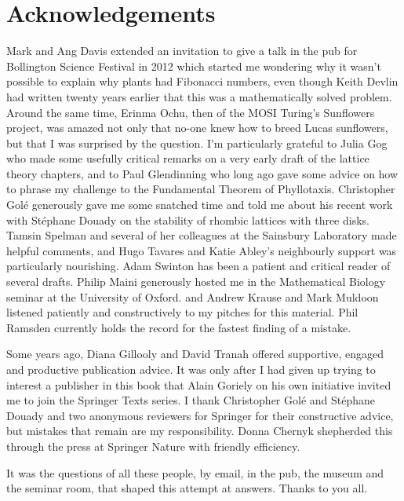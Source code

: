 


\chapter*{Acknowledgements}
Mark and Ang Davis extended an invitation to give a talk in the pub for Bollington Science Festival in 2012 which started me wondering why it wasn't possible to explain why plants had Fibonacci numbers, even though Keith Devlin had written twenty years earlier that this was a mathematically solved problem. Around the same time, Erinma Ochu, then of the MOSI Turing's Sunflowers project, was amazed not only that no-one knew how to breed Lucas sunflowers, but that I was surprised by the question.  
I'm particularly grateful to Julia Gog who made some usefully critical remarks on a very early draft of the lattice theory chapters, and to Paul Glendinning who long ago gave some advice on how to phrase my challenge to the Fundamental Theorem of Phyllotaxis.
Christopher Golé generously gave me some snatched time and told me about his recent work with Stéphane Douady on the stability of rhombic lattices with three disks. Tamsin Spelman and several of her colleagues at the Sainsbury Laboratory made helpful comments, and Hugo Tavares and Katie Abley's neighbourly support was particularly nourishing. Adam Swinton has been a patient and critical reader of several drafts.   Philip Maini generously hosted me in the Mathematical Biology seminar at the University of Oxford. and Andrew Krause and Mark Muldoon listened patiently and constructively to my pitches for this material. Phil Ramsden currently holds the record for the fastest finding of a mistake. 

Some years ago,  Diana Gillooly and David Tranah offered supportive, engaged and productive publication advice. It was only after I had given up trying to interest a publisher in this book that Alain Goriely on his own initiative invited me to join the Springer Texts series. I thank Christopher Golé and Stéphane Douady and two anonymous reviewers for Springer for their constructive advice, but mistakes that remain are my responsibility. Donna Chernyk shepherded this through the press at Springer Nature with friendly efficiency.

It was the questions of all these people, by email, in the pub, the museum and the seminar room, that shaped this attempt at answers.  Thanks to you all. 


